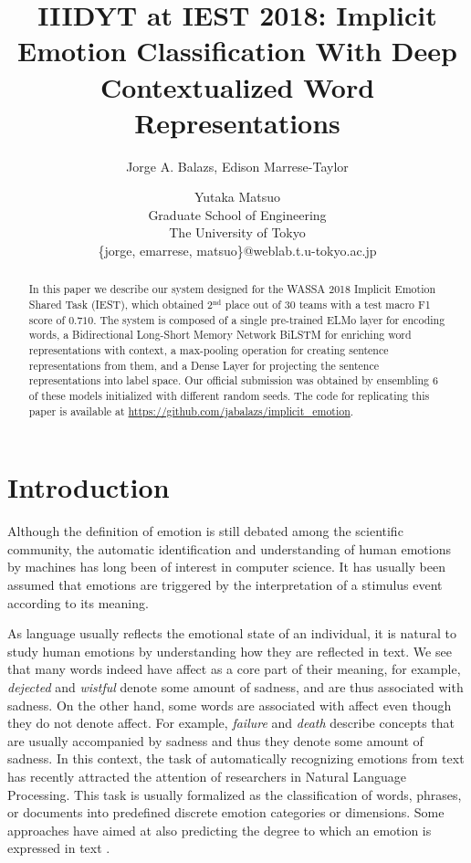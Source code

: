 \documentclass[11pt,a4paper]{article}
\title{IIIDYT at IEST 2018: Implicit Emotion Classification With Deep
Contextualized Word Representations}
\author{Jorge A. Balazs, Edison Marrese-Taylor \and Yutaka Matsuo \\
  Graduate School of Engineering\\
  The University of Tokyo\\
  \{jorge, emarrese, matsuo\}@weblab.t.u-tokyo.ac.jp \\
}
\date{}
\begin{document}
\maketitle
\begin{abstract}

In this paper we describe our system designed for the WASSA 2018 Implicit
Emotion Shared Task (IEST), which obtained 2$^{\text{nd}}$ place out of 30 teams
with a test macro F1 score of $0.710$. The system is composed of a single
pre-trained ELMo layer for encoding words, a Bidirectional Long-Short Memory
Network BiLSTM for enriching word representations with context, a max-pooling
operation for creating sentence representations from them, and a Dense Layer for
projecting the sentence representations into label space. Our official
submission was obtained by ensembling 6 of these models initialized with
different random seeds. The code for replicating this paper is available at
\url{https://github.com/jabalazs/implicit_emotion}.

\end{abstract}

\section{Introduction}

Although the definition of emotion is still debated among the scientific
community, the automatic identification and understanding of human emotions by
machines has long been of interest in computer science. It has usually been
assumed that emotions are triggered by the interpretation of a stimulus event
according to its meaning. 

As language usually reflects the emotional state of an individual, it is natural
to study human emotions by understanding how they are reflected in text. We see
that many words indeed have affect as a core part of their meaning, for example,
\textit{dejected} and \textit{wistful} denote some amount of sadness, and are
thus associated with sadness. On the other hand, some words are associated with
affect even though they do not denote affect. For example, \textit{failure} and
\textit{death} describe concepts that are usually accompanied by sadness and
thus they denote some amount of sadness. In this context, the task of
automatically recognizing emotions from text has recently attracted the
attention of researchers in Natural Language Processing. This task is usually
formalized as the classification of words, phrases, or documents into predefined
discrete emotion categories or dimensions. Some approaches have aimed at also
predicting the degree to which an emotion is expressed in text
\cite{wassa_emoint_2017}.
\end{document}

